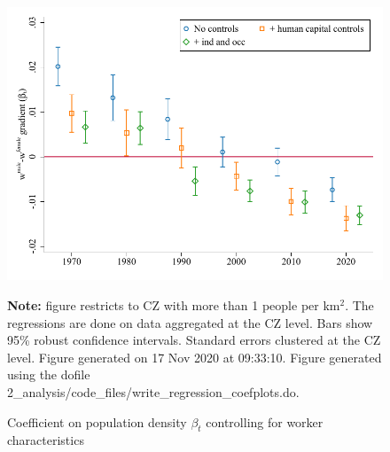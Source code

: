\begin{figure}[!h]
\centering
\caption{Coefficient on population density $ \beta_t $ controlling for worker characteristics}
\includegraphics[width=1\textwidth]{../2_analysis/output/figures/with_ind_gradients_individual_l_czone_density_full_time}
\par \begin{minipage}[h]{\textwidth}{\tiny\textbf{Note:} figure restricts to CZ with more than 1 people per km$^2$. The regressions are done on data aggregated at the CZ level. Bars show 95\% robust confidence intervals. Standard errors clustered at the CZ level. Figure generated on 17 Nov 2020 at 09:33:10. Figure generated using the dofile 2\_analysis/code\_files/write\_regression\_coefplots.do.}\end{minipage}
\end{figure}
